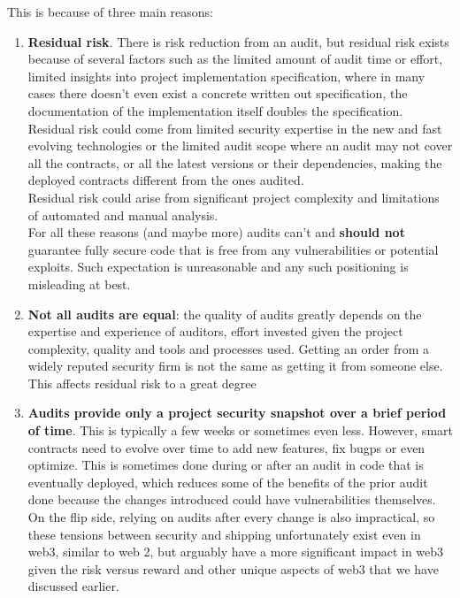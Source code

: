 This is because of three main reasons:

\begin{enumerate}
\def\labelenumi{\arabic{enumi}.}
\item
  \textbf{Residual risk}. There is risk reduction from an audit, but
  residual risk exists because of several factors such as the limited
  amount of audit time or effort, limited insights into project
  implementation specification, where in many cases there doesn't even
  exist a concrete written out specification, the documentation of the
  implementation itself doubles the specification.\\

  Residual risk could come from limited security expertise in the new
  and fast evolving technologies or the limited audit scope where an
  audit may not cover all the contracts, or all the latest versions or
  their dependencies, making the deployed contracts different from the
  ones audited.\\

  Residual risk could arise from significant project complexity and
  limitations of automated and manual analysis.\\

  For all these reasons (and maybe more) audits can't and \textbf{should
  not} guarantee fully secure code that is free from any vulnerabilities
  or potential exploits. Such expectation is unreasonable and any such
  positioning is misleading at best.
\item
  \textbf{Not all audits are equal}: the quality of audits greatly
  depends on the expertise and experience of auditors, effort invested
  given the project complexity, quality and tools and processes used.
  Getting an order from a widely reputed security firm is not the same
  as getting it from someone else. This affects residual risk to a great
  degree
\item
  \textbf{Audits provide only a project security snapshot over a brief
  period of time}. This is typically a few weeks or sometimes even less.
  However, smart contracts need to evolve over time to add new features,
  fix bugps or even optimize. This is sometimes done during or after an
  audit in code that is eventually deployed, which reduces some of the
  benefits of the prior audit done because the changes introduced could
  have vulnerabilities themselves.\\

  On the flip side, relying on audits after every change is also
  impractical, so these tensions between security and shipping
  unfortunately exist even in web3, similar to web 2, but arguably have
  a more significant impact in web3 given the risk versus reward and
  other unique aspects of web3 that we have discussed earlier.
\end{enumerate}

